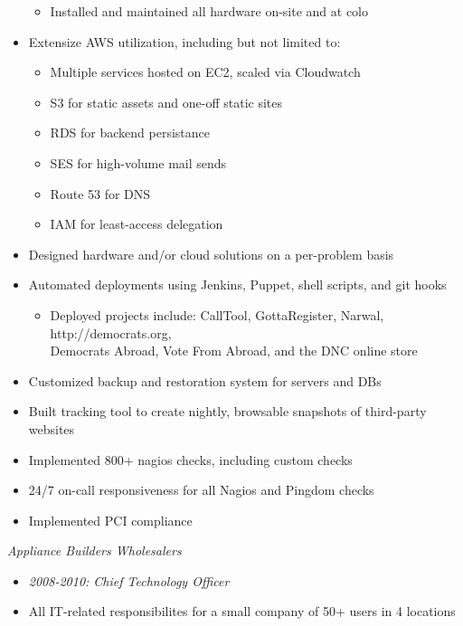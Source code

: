 \documentclass[11pt]{res} %
\begin{document}
\begin{resume}
\begin{itemize}
\begin{itemize}
                    \item Installed and maintained all hardware on-site and at colo
                \end{itemize}
            \item Extensize AWS utilization, including but not limited to:
                \begin{itemize}
                    \item Multiple services hosted on EC2, scaled via Cloudwatch
                    \item S3 for static assets and one-off static sites
                    \item RDS for backend persistance
                    \item SES for high-volume mail sends
                    \item Route 53 for DNS
                    \item IAM for least-access delegation
                \end{itemize}
            \item Designed hardware and/or cloud solutions on a per-problem basis
            \item Automated deployments using Jenkins, Puppet, shell scripts, and git hooks
                \begin{itemize}
                    \item Deployed projects include: CallTool, GottaRegister, Narwal, http://democrats.org, \\Democrats Abroad, Vote From Abroad, and the DNC online store
                \end{itemize}
            \item Customized backup and restoration system for servers and DBs
            \item Built tracking tool to create nightly, browsable snapshots of third-party websites
            \item Implemented 800+ nagios checks, including custom checks
            \item 24/7 on-call responsiveness for all Nagios and Pingdom checks
            \item Implemented PCI compliance
        \end{itemize}


\newpage
\sl{Appliance Builders Wholesalers} 
    \begin{itemize} 
        \item {\sl 2008-2010: Chief Technology Officer}
        \item All IT-related responsibilites for a small company of 50+ users in 4 locations
    \end{itemize}


\end{resume}
\end{document}
